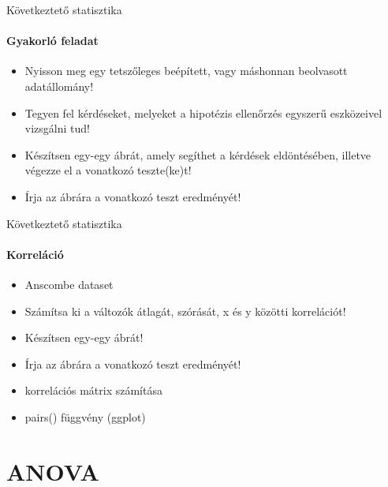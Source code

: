 \documentclass[10pt]{beamer}
\begin{document}
\begin{frame}{Következtető statisztika}
\framesubtitle{Gyakorló feladat}
\begin{itemize}
\item Nyisson meg egy tetszőleges beépített, vagy máshonnan beolvasott adatállomány!
\item Tegyen fel kérdéseket, melyeket a hipotézis ellenőrzés egyszerű eszközeivel vizsgálni tud!
\item Készítsen egy-egy ábrát, amely segíthet a kérdések eldöntésében, illetve végezze el a vonatkozó teszte(ke)t!
\item Írja az ábrára a vonatkozó teszt eredményét!
\end{itemize}
\end{frame}

\begin{frame}{Következtető statisztika}
\framesubtitle{Korreláció}
\begin{itemize}
\item Anscombe dataset
\item Számítsa ki a változók átlagát, szórását, x és y közötti korrelációt!
\item Készítsen egy-egy ábrát!
\item Írja az ábrára a vonatkozó teszt eredményét!
\item korrelációs mátrix számítása
\item pairs() függvény (ggplot)
\end{itemize}
\end{frame}

\section{ANOVA}
\end{document}
